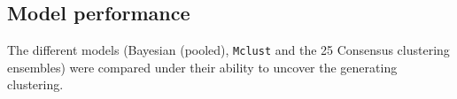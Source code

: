 \documentclass[]{article}
\begin{document}

\subsection{Model performance} \label{sec:simModelPerformance}

%

The different models (Bayesian (pooled), \texttt{Mclust} and the 25 Consensus clustering ensembles) were compared under their ability to uncover the generating clustering.
\end{document}

